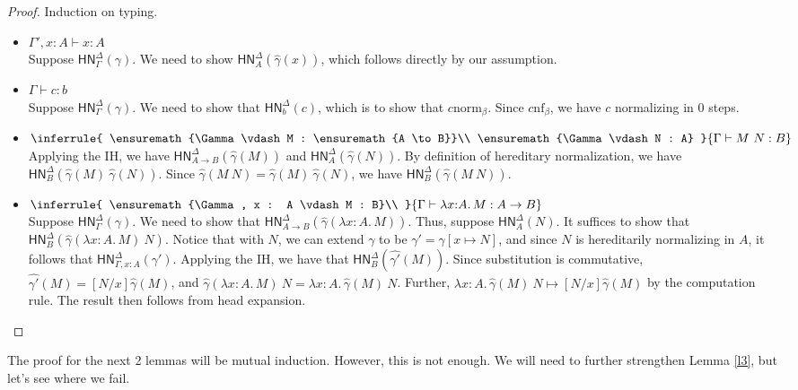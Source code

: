 \documentclass{article}
\newcommand{\hasEF}[3]{\ensuremath{#1 \vdash #2 : #3}}
\newcommand{\bnf}[1]{#1 \mathrel{\text{nf}_\beta}}
\newcommand{\bnorm}[1]{#1 \mathrel{\text{norm}_\beta}}
\newcommand{\hnorm}[3]{\ensuremath{\mathsf{HN}^{#1}_{#2}(#3)}}
\newcommand{\step}[2]{\ensuremath{#1 \mapsto #2}}
\newcommand{\fn}[2]{\ensuremath{#1 \to #2}}
\newcommand{\ap}[2]{\ensuremath{#1\ #2}}
\newcommand{\lam}[3]{\ensuremath{\lambda #1 {:} #2.\, #3}}
\begin{document}
\begin{proof}
Induction on typing. 
\begin{itemize}
  \setlength\itemsep{1em}
  \item $\hasEF{\Gamma', x : A}{x}{A}$\\
    Suppose $\hnorm{\Delta}{\Gamma}{\gamma}$. 
    We need to  show $\hnorm{\Delta}{A}{\hat{\gamma}(x)}$, which follows directly by our assumption.
  \item $\hasEF{\Gamma}{c}{b}$\\
    Suppose $\hnorm{\Delta}{\Gamma}{\gamma}$. We need to show that $\hnorm{\Delta}{b}{c}$, which is to 
    show that $\bnorm{c}$. Since $\bnf{c}$, we have $c$ normalizing in 0 steps. 
  \item $\inferrule{
      \hasEF{\Gamma}{M}{\fn{A}{B}}\\
      \hasEF{\Gamma}{N}{A}
    }{\hasEF{\Gamma}{\ap{M}{N}}{B}}$\\
    Applying the IH, we have $\hnorm{\Delta}{\fn{A}{B}}{\hat{\gamma}(M)}$
    and $\hnorm{\Delta}{A}{\hat{\gamma}(N)}$. By definition of hereditary normalization, we have
    $\hnorm{\Delta}{B}{\ap{\hat{\gamma}(M)}{\hat{\gamma}(N)}}$. Since $\hat{\gamma}(\ap{M}{N}) = 
    \ap{\hat{\gamma}(M)}{\hat{\gamma}(N)}$, we have
    $\hnorm{\Delta}{B}{\hat{\gamma}(\ap{M}{N})}$.
  \item
    $\inferrule{
      \hasEF{\Gamma, x : A}{M}{B}\\
    }{\hasEF{\Gamma}{\lam{x}{A}{M}}{\fn{A}{B}}}$\\
    Suppose $\hnorm{\Delta}{\Gamma}{\gamma}$. We need to show that 
    $\hnorm{\Delta}{\fn{A}{B}}{\hat{\gamma}(\lam{x}{A}{M})}$. 
    Thus, suppose $\hnorm{\Delta}{A}{N}$. It suffices to show that 
    $\hnorm{\Delta}{B}{\ap{\hat{\gamma}(\lam{x}{A}{M})}{N}}$. Notice that with $N$, we can extend $\gamma$ to be
    $\gamma' = \gamma[x \mapsto N]$, and since $N$ is hereditarily normalizing in $A$, it follows that 
    $\hnorm{\Delta}{\Gamma,x : A}{\gamma'}$. Applying the IH, we have that $\hnorm{\Delta}{B}{\hat{\gamma'}(M)}$. 
    Since substitution is commutative, $\hat{\gamma'}(M) = [N/x]\hat{\gamma}(M)$, and 
    $\ap{\hat{\gamma}(\lam{x}{A}{M})}{N} = \ap{\lam{x}{A}{\hat{\gamma}(M)}}{N}$. Further, 
    $\step{\ap{\lam{x}{A}{\hat{\gamma}(M)}}{N}}{[N/x]\hat{\gamma}(M)}$ by the computation rule. The result then follows
    from head expansion. 
   \qedhere
\end{itemize}
\end{proof}

The proof for the next 2 lemmas will be mutual induction. However, this is not enough. We will need to further
strengthen Lemma \ref{l3}, but let's see where we fail.
\end{document}
